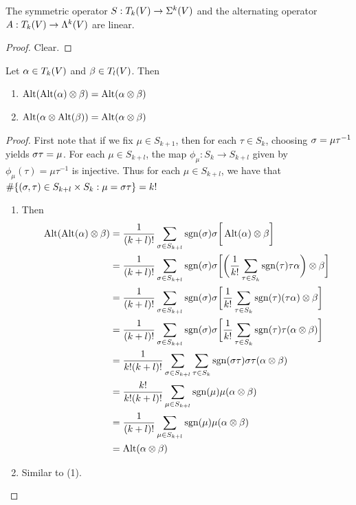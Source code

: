 \documentclass{book}
\begin{document}
	\begin{ex}
		The symmetric operator $S: T_k(V) \rightarrow \Sigma^k(V)$ and the alternating operator $A: T_k(V) \rightarrow \Lambda^k(V)$ are linear.
	\end{ex}

	\begin{proof}
		Clear.
	\end{proof}

	\begin{ex}
		Let $\alpha \in T_k(V)$ and $\beta \in T_l(V)$. Then 
		\begin{enumerate}
			\item $\operatorname{Alt}(\operatorname{Alt}(\alpha) \otimes \beta) = \operatorname{Alt}(\alpha \otimes \beta)$
			\item $\operatorname{Alt}(\alpha \otimes \operatorname{Alt}(\beta)) = \operatorname{Alt}(\alpha \otimes \beta)$
		\end{enumerate}
	\end{ex}
	
	\begin{proof}
		First note that if we fix $\mu \in S_{k+1}$, then for each $\tau \in S_k$, choosing $\sigma = \mu \tau^{-1}$ yields $\sigma \tau = \mu$. For each $\mu \in S_{k+l}$, the map $\phi_{\mu}: S_{k} \rightarrow S_{k+l}$ given by $\phi_{\mu}(\tau) = \mu \tau^{-1}$ is injective. Thus for each $\mu \in S_{k+l}$, we have that $\# \{ (\sigma, \tau) \in S_{k+l} \times S_{k}: \mu = \sigma \tau \} = k!$ 
		\begin{enumerate}
			\item Then
			\begin{align*}
				\operatorname{Alt}(\operatorname{Alt}(\alpha) \otimes \beta)
				& = \frac{1}{(k+l)!} \sum_{\sigma \in S_{k+l}} \operatorname{sgn}(\sigma) \sigma \bigg [\operatorname{Alt}(\alpha) \otimes \beta \bigg] \\
				& = \frac{1}{(k+l)!} \sum_{\sigma \in S_{k+l}} \operatorname{sgn}(\sigma) \sigma \bigg[ \bigg( \frac{1}{k!}\sum_{\tau \in S_{k} } \operatorname{sgn}(\tau) \tau\alpha \bigg) \otimes \beta \bigg] \\
				& = \frac{1}{(k+l)!} \sum_{\sigma \in S_{k+l}} \operatorname{sgn}(\sigma) \sigma \bigg[   \frac{1}{k!} \sum_{\tau \in S_{k} } \operatorname{sgn}(\tau) (\tau\alpha)  \otimes \beta \bigg] \\
				& = \frac{1}{(k+l)!} \sum_{\sigma \in S_{k+l}} \operatorname{sgn}(\sigma) \sigma \bigg[  \frac{1}{k!} \sum_{\tau \in S_{k} } \operatorname{sgn}(\tau) \tau (\alpha  \otimes \beta) \bigg] \\
				& =  \frac{1}{k! (k+l)!}\sum_{\sigma \in S_{k+l} } \sum_{\tau \in S_{k} } \operatorname{sgn}(\sigma \tau) \sigma \tau (\alpha  \otimes \beta) \\
				& =  \frac{k!}{k!(k+l)!} \sum_{\mu \in S_{k+l} }  \operatorname{sgn}(\mu) \mu (\alpha  \otimes \beta)\\
				& =  \frac{1}{(k+l)!} \sum_{\mu \in S_{k+l} }  \operatorname{sgn}(\mu) \mu (\alpha  \otimes \beta)\\
				& = \operatorname{Alt}(\alpha \otimes \beta)
			\end{align*} 
			\item Similar to (1).
		\end{enumerate}
	\end{proof}
	
\end{document}
